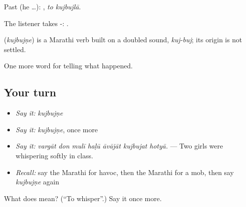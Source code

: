 Past (he …):  , \emph{to kujbujlā}.

The listener takes -:  .

\begin{cousinweb}
\textbf{} (\emph{kujbujṇe}) is a Marathi verb built on a doubled sound, \emph{kuj-buj}; its origin is not settled.
\end{cousinweb}

\begin{grammarlens}[title={What you've built}]
One more word for telling what happened.
\end{grammarlens}

\subsection*{Your turn}
\begin{itemize}
\raggedright
  \item \emph{Say it:} \emph{kujbujṇe}
  \item \emph{Say it:} \emph{kujbujṇe}, once more
  \item \emph{Say it:} \emph{vargāt don mulī haḷū āvājāt kujbujat hotyā.} — Two girls were whispering softly in class.
  \item \emph{Recall:} say the Marathi for havoc, then the Marathi for a mob, then say \emph{kujbujṇe} again
\end{itemize}

\begin{tcolorbox}[breakable,colback=teal!4,colframe=teal!35!black,title={Before you move on}]
What does  mean? (\textquotedblleft{}To whisper\textquotedblright{}.) Say it once more.
\end{tcolorbox}
